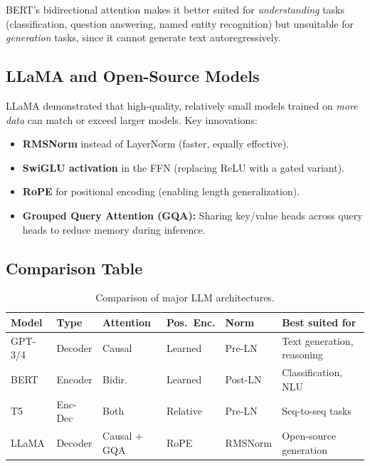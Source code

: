 BERT's bidirectional attention makes it better suited for \emph{understanding} tasks (classification, question answering, named entity recognition) but unsuitable for \emph{generation} tasks, since it cannot generate text autoregressively.

\subsection{LLaMA and Open-Source Models}

LLaMA \citep{touvron2023} demonstrated that high-quality, relatively small models trained on \emph{more data} can match or exceed larger models. Key innovations:

\begin{itemize}[leftmargin=1.5em]
  \item \textbf{RMSNorm} instead of LayerNorm (faster, equally effective).
  \item \textbf{SwiGLU activation} in the FFN (replacing ReLU with a gated variant).
  \item \textbf{RoPE} for positional encoding (enabling length generalization).
  \item \textbf{Grouped Query Attention (GQA):} Sharing key/value heads across query heads to reduce memory during inference.
\end{itemize}

\subsection{Comparison Table}

\begin{table}[ht]
\centering
\caption{Comparison of major LLM architectures.}
\label{tab:llm-comparison}
\renewcommand{\arraystretch}{1.15}
\begin{tabularx}{\textwidth}{L{2.0cm} C{1.8cm} C{1.6cm} C{1.6cm} C{1.6cm} Y}
\toprule
\textbf{Model} & \textbf{Type} & \textbf{Attention} & \textbf{Pos.\ Enc.} & \textbf{Norm} & \textbf{Best suited for} \\
\midrule
GPT-3/4 & Decoder & Causal & Learned & Pre-LN & Text generation, reasoning \\
BERT & Encoder & Bidir. & Learned & Post-LN & Classification, NLU \\
T5 & Enc-Dec & Both & Relative & Pre-LN & Seq-to-seq tasks \\
LLaMA & Decoder & Causal + GQA & RoPE & RMSNorm & Open-source generation \\
\bottomrule
\end{tabularx}
\end{table}

